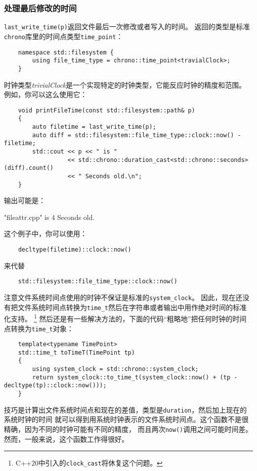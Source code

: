 \subsubsection{处理最后修改的时间}\label{ch20.4.1.3}
\texttt{last\_write\_time(p)}返回文件最后一次修改或者写入的时间。
返回的类型是标准\texttt{chrono}库里的时间点类型\texttt{time\_point}：
\begin{lstlisting}
    namespace std::filesystem {
        using file_time_type = chrono::time_point<travialClock>;
    }
\end{lstlisting}
时钟类型\emph{trivialClock}是一个实现特定的时钟类型，它能反应时钟的精度和范围。
例如，你可以这么使用它：
\begin{lstlisting}
    void printFileTime(const std::filesystem::path& p)
    {
        auto filetime = last_write_time(p);
        auto diff = std::filesystem::file_time_type::clock::now() - filetime;
        std::cout << p << " is "
                  << std::chrono::duration_cast<std::chrono::seconds>(diff).count()
                  << " Seconds old.\n";
    }
\end{lstlisting}
输出可能是：
\begin{blacklisting}
    "fileattr.cpp" is 4 Seconds old.
\end{blacklisting}
这个例子中，你可以使用：
\begin{lstlisting}
    decltype(filetime)::clock::now()
\end{lstlisting}
来代替
\begin{lstlisting}
    std::filesystem::file_time_type::clock::now()
\end{lstlisting}
注意文件系统时间点使用的时钟不保证是标准的\texttt{system\_clock}。
因此，现在还没有把文件系统时间点转换为\texttt{time\_t}然后在字符串或者输出中用作绝对时间的标准化支持。
\footnote{C++20中引入的\texttt{clock\_cast}将休复这个问题。}
然后还是有一些解决方法的，下面的代码“粗略地”把任何时钟的时间点转换为\texttt{time\_t}对象：
\begin{lstlisting}
    template<typename TimePoint>
    std::time_t toTimeT(TimePoint tp)
    {
        using system_clock = std::chrono::system_clock;
        return system_clock::to_time_t(system_clock::now() + (tp - decltype(tp)::clock::now()));
    }
\end{lstlisting}
技巧是计算出文件系统时间点和现在的差值，类型是\texttt{duration}，然后加上现在的系统时钟的时间
就可以得到用系统时钟表示的文件系统时间点。这个函数不是很精确，因为不同的时钟可能有不同的精度，
而且两次\texttt{now()}调用之间可能时间差。然而，一般来说，这个函数工作得很好。

